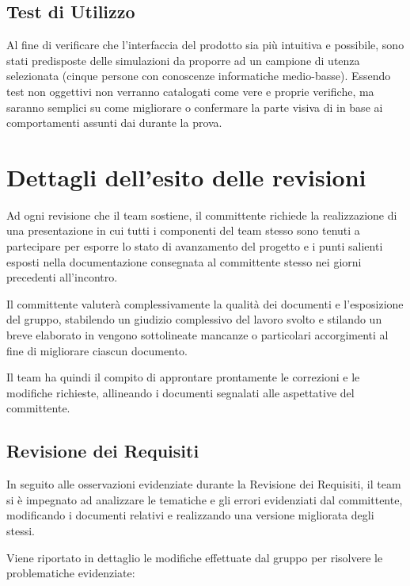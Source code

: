 \subsection{Test di Utilizzo}
Al fine di verificare che l'interfaccia del prodotto sia più intuitiva e  possibile, sono stati predisposte delle simulazioni da proporre ad un campione di utenza selezionata (cinque persone con conoscenze informatiche medio-basse).
Essendo test non oggettivi non verranno catalogati come vere e proprie verifiche, ma saranno semplici  su come migliorare o confermare la parte visiva di \caName in base ai comportamenti assunti dai  durante la prova.
\clearpage

\section{Dettagli dell'esito delle revisioni}
Ad ogni revisione che il team sostiene, il committente richiede la realizzazione di una presentazione in cui tutti i componenti del team stesso sono tenuti a partecipare per esporre lo stato di avanzamento del progetto e i punti salienti esposti nella documentazione consegnata al committente stesso nei giorni precedenti all'incontro.

Il committente valuterà complessivamente la qualità dei documenti e l'esposizione del gruppo, stabilendo un giudizio complessivo del lavoro svolto e stilando un breve elaborato in vengono sottolineate mancanze o particolari accorgimenti al fine di migliorare ciascun documento.

Il team ha quindi il compito di approntare prontamente le correzioni e le modifiche richieste, allineando i documenti segnalati alle aspettative del committente.

\subsection{Revisione dei Requisiti}
In seguito alle osservazioni evidenziate durante la Revisione dei Requisiti, il team si è impegnato ad analizzare le tematiche e gli errori evidenziati dal committente, modificando i documenti relativi e realizzando una versione migliorata degli stessi.

Viene riportato in dettaglio le modifiche effettuate dal gruppo per risolvere le problematiche evidenziate:

